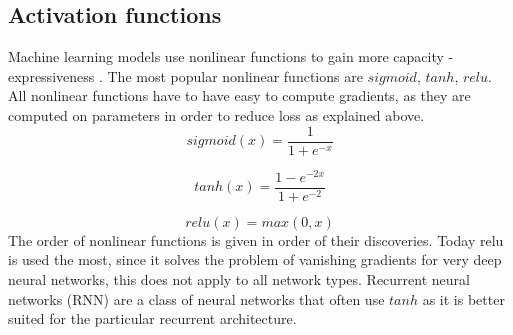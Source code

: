 \documentclass[times, utf8, diplomski]{fer}
\begin{document}
\subsection{Activation functions} \label{se:activation_functions}
Machine learning models use nonlinear functions to gain more capacity - expressiveness
. The most popular nonlinear functions are $sigmoid$, $tanh$, $relu$. All nonlinear functions have to have easy to compute gradients, as they are computed on parameters in order to reduce loss as explained above. 
\begin{equation} \label{eq:sigmoid}
	sigmoid(x) = \frac{1}{1 + e^{-x}}
\end{equation}

\begin{equation} \label{eq:tanh}
	tanh(x) = \frac{1 - e^{-2x}}{1 + e^{-2}}
\end{equation}

\begin{equation} \label{eq:relu}
	relu(x) = max(0, x)
\end{equation}
The order of nonlinear functions is given in order of their discoveries. Today relu is used the most, since it solves the problem of vanishing gradients for very deep neural networks, this does not apply to all network types. Recurrent neural networks (RNN) are a class of neural networks that often use $tanh$ as it is better suited for the particular recurrent architecture.
\end{document}
